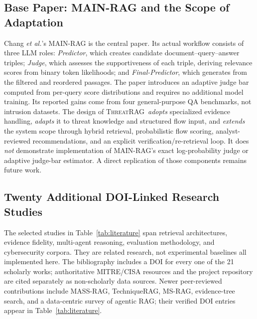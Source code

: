 \documentclass[journal,twoside]{IEEEtran}
\newcommand{\TR}{\textsc{ThreatRAG}}
\begin{document}
\subsection{Base Paper: MAIN-RAG and the Scope of Adaptation}
Chang \emph{et al.}'s MAIN-RAG \cite{mainrag} is the central paper. Its actual workflow consists of three LLM roles: \emph{Predictor}, which creates candidate document--query--answer triples; \emph{Judge}, which assesses the supportiveness of each triple, deriving relevance scores from binary token likelihoods; and \emph{Final-Predictor}, which generates from the filtered and reordered passages. The paper introduces an adaptive judge bar computed from per-query score distributions and requires no additional model training. Its reported gains come from four general-purpose QA benchmarks, not intrusion datasets. The design of \TR\ \emph{adopts} specialized evidence handling, \emph{adapts} it to threat knowledge and structured flow input, and \emph{extends} the system scope through hybrid retrieval, probabilistic flow scoring, analyst-reviewed recommendations, and an explicit verification/re-retrieval loop. It does \emph{not} demonstrate implementation of MAIN-RAG's exact log-probability judge or adaptive judge-bar estimator. A direct replication of those components remains future work.

\subsection{Twenty Additional DOI-Linked Research Studies}
The selected studies in Table~\ref{tab:literature} span retrieval architectures, evidence fidelity, multi-agent reasoning, evaluation methodology, and cybersecurity corpora. They are related research, not experimental baselines all implemented here. The bibliography includes a DOI for every one of the 21 scholarly works; authoritative MITRE/CISA resources and the project repository are cited separately as non-scholarly data sources. Newer peer-reviewed contributions include MASS-RAG, TechniqueRAG, MS-RAG, evidence-tree search, and a data-centric survey of agentic RAG; their verified DOI entries appear in Table~\ref{tab:literature}.
\end{document}
